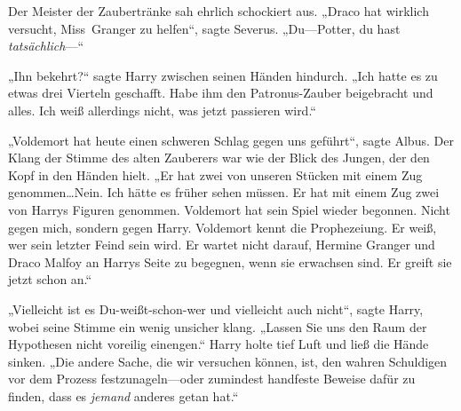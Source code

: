 Der Meister der Zaubertränke sah ehrlich schockiert aus.
„Draco hat wirklich versucht, Miss~Granger zu helfen“, sagte Severus.
„Du—Potter, du hast \emph{tatsächlich}—“

„Ihn bekehrt?“ sagte Harry zwischen seinen Händen hindurch.
„Ich hatte es zu etwas drei Vierteln geschafft. Habe ihm den Patronus-Zauber beigebracht und alles. Ich weiß allerdings nicht, was jetzt passieren wird.“

„Voldemort hat heute einen schweren Schlag gegen uns geführt“, sagte Albus. Der Klang der Stimme des alten Zauberers war wie der Blick des Jungen, der den Kopf in den Händen hielt.
„Er hat zwei von unseren Stücken mit einem Zug genommen…Nein. Ich hätte es früher sehen müssen. Er hat mit einem Zug zwei von Harrys Figuren genommen. Voldemort hat sein Spiel wieder begonnen. Nicht gegen mich, sondern gegen Harry. Voldemort kennt die Prophezeiung. Er weiß, wer sein letzter Feind sein wird. Er wartet nicht darauf, Hermine Granger und Draco Malfoy an Harrys Seite zu begegnen, wenn sie erwachsen sind. Er greift sie jetzt schon an.“

„Vielleicht ist es Du-weißt-schon-wer und vielleicht auch nicht“, sagte Harry, wobei seine Stimme ein wenig unsicher klang.
„Lassen Sie uns den Raum der Hypothesen nicht voreilig einengen.“ Harry holte tief Luft und ließ die Hände sinken.
„Die andere Sache, die wir versuchen können, ist, den wahren Schuldigen vor dem Prozess festzunageln—oder zumindest handfeste Beweise dafür zu finden, dass es \emph{jemand} anderes getan hat.“

